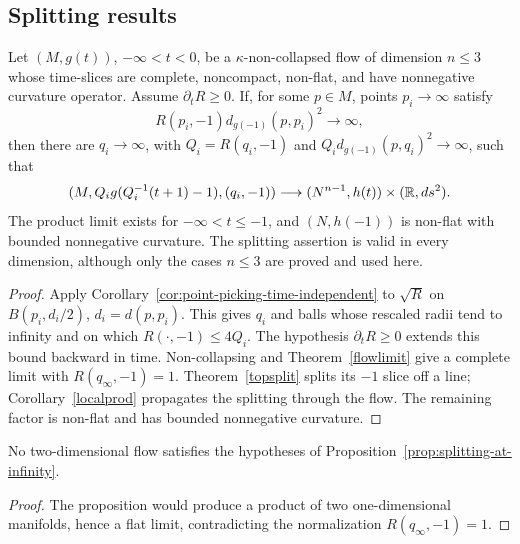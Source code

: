 \subsection{Splitting results}

\begin{proposition}\label{prop:splitting-at-infinity}
\label{prodatinf}

Let $(M,g(t))$, $-\infty<t<0$, be a $\kappa$-non-collapsed flow of
dimension $n\leq3$ whose time-slices are complete, noncompact,
non-flat, and have nonnegative curvature operator. Assume
$\partial_tR\geq0$. If, for some $p\in M$, points $p_i\to\infty$
satisfy
\[
 R(p_i,-1)d_{g(-1)}(p,p_i)^2\longrightarrow\infty,
\]
then there are $q_i\to\infty$, with $Q_i=R(q_i,-1)$ and
$Q_id_{g(-1)}(p,q_i)^2\to\infty$, such that
\[
 (M,Q_ig(Q_i^{-1}(t+1)-1),(q_i,-1))
 \longrightarrow (N^{n-1},h(t))\times(\mathbb{R},ds^2).
\]
The product limit exists for $-\infty<t\leq-1$, and
$(N,h(-1))$ is non-flat with bounded nonnegative curvature.
The splitting assertion is valid in every dimension, although only
the cases $n\leq3$ are proved and used here.
\end{proposition}
\begin{proof}
\sketch
{}
Apply Corollary~\ref{cor:point-picking-time-independent} to
$\sqrt R$ on $B(p_i,d_i/2)$, $d_i=d(p,p_i)$. This gives $q_i$ and
balls whose rescaled radii tend to infinity and on which
$R(\cdot,-1)\leq4Q_i$. The hypothesis $\partial_tR\geq0$ extends
this bound backward in time. Non-collapsing and
Theorem~\ref{flowlimit} give a complete limit with
$R(q_\infty,-1)=1$. Theorem~\ref{topsplit} splits its $-1$ slice
off a line; Corollary~\ref{localprod} propagates the splitting
through the flow. The remaining factor is non-flat and has bounded
nonnegative curvature.
\end{proof}

\begin{corollary}\label{cor:no-two-dimensional-splitting-example}
\label{compact2D}

No two-dimensional flow satisfies the hypotheses of
Proposition~\ref{prop:splitting-at-infinity}.
\end{corollary}
\begin{proof}
\sketch The proposition would produce a product of two
one-dimensional manifolds, hence a flat limit, contradicting the
normalization $R(q_\infty,-1)=1$.
\end{proof}

